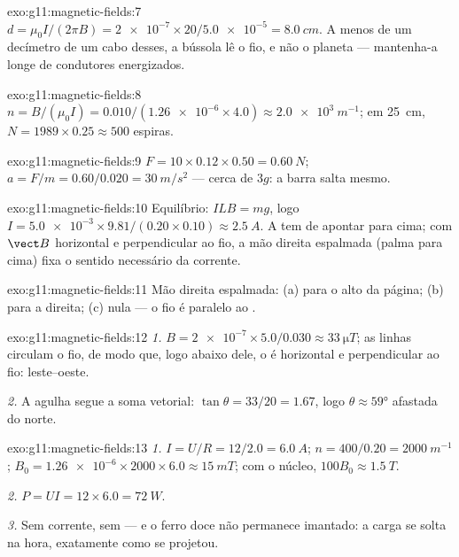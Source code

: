\begin{solution}{exo:g11:magnetic-fields:7}
$d = \mu_0 I / (2\pi B) = \num{2e-7} \times 20 / \num{5.0e-5}
= \qty{8.0}{cm}$. A menos de um decímetro de um cabo desses, a bússola lê
o fio, e não o planeta --- mantenha-a longe de condutores energizados.
\end{solution}

\begin{solution}{exo:g11:magnetic-fields:8}
$n = B/(\mu_0 I) = 0.010 / (\num{1.26e-6} \times 4.0)
\approx \qty{2.0e3}{m^{-1}}$; em \qty{25}{cm},
$N = 1989 \times 0.25 \approx 500$ espiras.
\end{solution}

\begin{solution}{exo:g11:magnetic-fields:9}
$F = 10 \times 0.12 \times 0.50 = \qty{0.60}{N}$;
$a = F/m = 0.60/0.020 = \qty{30}{m/s^2}$ --- cerca de $3g$: a barra salta
mesmo.
\end{solution}

\begin{solution}{exo:g11:magnetic-fields:10}
Equilíbrio: $ILB = mg$, logo
$I = \num{5.0e-3} \times 9.81 / (0.20 \times 0.10) \approx
\qty{2.5}{A}$. A  tem de apontar para cima; com $\vect B$
horizontal e perpendicular ao fio, a mão direita espalmada (palma para
cima) fixa o sentido necessário da corrente.
\end{solution}

\begin{solution}{exo:g11:magnetic-fields:11}
Mão direita espalmada: (a) para o alto da página; (b) para a direita;
(c)  nula --- o fio é paralelo ao .
\end{solution}

\begin{solution}{exo:g11:magnetic-fields:12}
\emph{1.} $B = \num{2e-7} \times 5.0 / 0.030 \approx
\qty{33}{\micro T}$; as linhas circulam o fio, de modo que, logo abaixo
dele, o  é horizontal e perpendicular ao fio: leste--oeste.

\emph{2.} A agulha segue a soma vetorial: $\tan\theta = 33/20 = 1.67$,
logo $\theta \approx \ang{59}$ afastada do norte.
\end{solution}

\begin{solution}{exo:g11:magnetic-fields:13}
\emph{1.} $I = U/R = 12/2.0 = \qty{6.0}{A}$;
$n = 400/0.20 = \qty{2000}{m^{-1}}$;
$B_0 = \num{1.26e-6} \times 2000 \times 6.0 \approx \qty{15}{mT}$; com o
núcleo, $100 B_0 \approx \qty{1.5}{T}$.

\emph{2.} $P = UI = 12 \times 6.0 = \qty{72}{W}$.

\emph{3.} Sem corrente, sem  --- e o ferro doce não permanece
imantado: a carga se solta na hora, exatamente como se projetou.
\end{solution}

